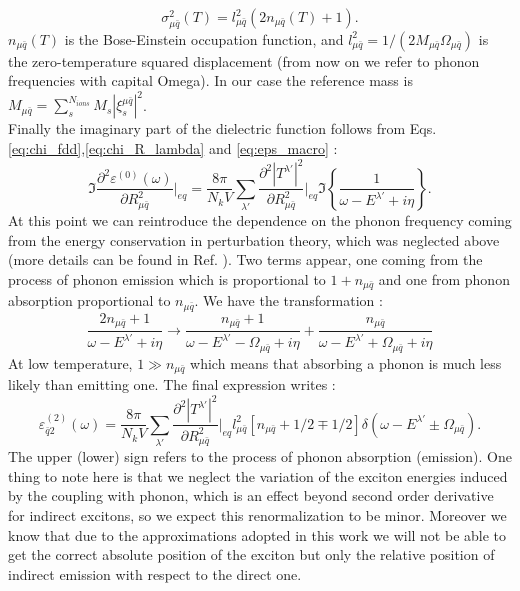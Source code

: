 \begin{equation}
	\sigma^2_{\mu\bar{q}}(T) = l^2_{\mu\bar{q}} (2n_{\mu\bar{q}}(T) + 1).
\end{equation}
$n_{\mu\bar{q}}(T)$ is the Bose-Einstein occupation function, and $l^2_{\mu\bar{q}} = 1/(2M_{\mu\bar{q}}\Omega_{\mu\bar{q}})$ is the zero-temperature squared displacement (from now on we refer to phonon frequencies with capital Omega). In our case the reference mass is $M_{\mu\bar{q}} = \sum^{N_{ions}}_s M_s |\xi_s^{\mu\bar{q}}|^2$.\\
Finally the imaginary part of the dielectric function follows from Eqs. \eqref{eq:chi_fdd},\eqref{eq:chi_R_lambda} and \eqref{eq:eps_macro} : 
\begin{equation}
	\Im\frac{\partial^2 \varepsilon^{(0)}(\omega)}{\partial R^2_{\mu\bar{q}}}\biggr|_{eq} = \frac{8\pi}{N_k V} \sum_{\lambda'} \frac{\partial^2 |T^{\lambda'}|^2}{\partial R^2_{\mu\bar{q}}}\biggr|_{eq} \Im\left\{ \frac{1}{\omega - E^{\lambda'} + i\eta} \right\}.
\end{equation}
At this point we can reintroduce the dependence on the phonon frequency coming from the energy conservation in perturbation theory, which was neglected above (more details can be found in Ref. \cite{paleari2019first}). Two terms appear, one coming from the process of phonon emission which is proportional to $1 + n_{\mu\bar{q}}$ and one from phonon absorption proportional to $n_{\mu\bar{q}}$. We have the transformation :
\begin{equation}
	\frac{2n_{\mu\bar{q}} + 1}{\omega - E^{\lambda'} + i\eta} \to \frac{n_{\mu\bar{q}} + 1}{\omega - E^{\lambda'} - \Omega_{\mu\bar{q}} + i\eta} + \frac{n_{\mu\bar{q}}}{\omega - E^{\lambda'} + \Omega_{\mu\bar{q}} + i\eta}
\end{equation}
At low temperature, $1 \gg n_{\mu\bar{q}}$ which means that absorbing a phonon is much less likely than emitting one. 
The final expression writes :
\begin{equation}
	\varepsilon^{(2)}_{\bar{q}2}(\omega) = \frac{8\pi}{N_k V} \sum_{\lambda'} \frac{\partial^2 |T^{\lambda'}|^2}{\partial R^2_{\mu\bar{q}}}\biggr|_{eq} l^2_{\mu\bar{q}} \left[ n_{\mu\bar{q}} + 1/2 \mp 1/2 \right] \delta(\omega - E^{\lambda'} \pm \Omega_{\mu\bar{q}}). \label{eq:eps2_fdd}
\end{equation}
The upper (lower) sign refers to the process of phonon absorption (emission). One thing to note here is that we neglect the variation of the exciton energies induced by the coupling with phonon, which is an effect beyond second order derivative for indirect excitons, so we expect this renormalization to be minor.\cite{marini2008ab} Moreover we know that due to the approximations adopted in this work we will not be able to get the correct absolute position\cite{artus2021ellipsometry} of the exciton but only the relative position of indirect emission with respect to the direct one. 

